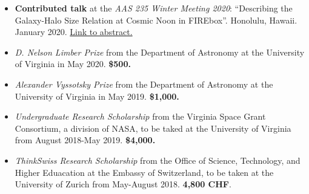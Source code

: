 \documentclass[a4paper,10pt,oneside]{article}
\begin{document}
\begin{itemize}[wide, labelwidth=!, labelindent=-11pt, parsep=0pt]
    \item {\bf Contributed talk} at the {\it AAS 235 Winter Meeting 2020}: ``Describing the Galaxy-Halo Size Relation at Cosmic Noon in FIREbox''. Honolulu, Hawaii. January 2020. \href{https://ui.adsabs.harvard.edu/abs/2020AAS...23526001R/abstract}{Link to abstract.}
\end{itemize}


\noindent{}

\begin{itemize}[wide, labelwidth=!, labelindent=-11pt, parsep=0pt]
    \item {\it D. Nelson Limber Prize} from the Department of Astronomy at the University of Virginia in May 2020. {\bf \$500.}
    \item {\it Alexander Vyssotsky Prize} from the Department of Astronomy at the University of Virginia in May 2019. {\bf \$1,000.}
    \item {\it Undergraduate Research Scholarship} from the Virginia Space Grant Consortium, a division of NASA, to be taked at the University of Virginia from August 2018-May 2019. {\bf \$4,000.} 
    \item {\it ThinkSwiss Research Scholarship} from the Office of Science, Technology, and Higher Eduacation at the Embassy of Switzerland, to be taken at the University of Zurich from May-August 2018. {\bf 4,800 CHF}.
\end{itemize}
\end{document}
